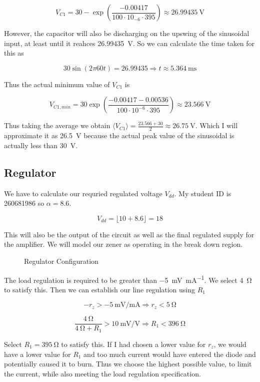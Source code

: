 \documentclass[journal]{IEEEtran}
\begin{document}
$$ V_{C1} = 30 - \exp \left( \frac{-0.00417}{100 \cdot 10_{-6} \cdot 395} \right) \approx \SI{26.99435}{\volt} $$

However, the capacitor will also be discharging on the upswing of the sinusoidal input, at least until it reahces \SI{26.99435}{\volt}. So we can calculate the time taken for this as

$$ 30 \sin\left( 2 \pi 60 t \right) = 26.99435 \Longrightarrow t \approx \SI{5.364}{\milli\second} $$

Thus the actual minimum value of $V_{C1}$ is

$$ V_{C1,min} = 30 \exp\left( \frac{-0.00417 - 0.00536}{100 \cdot 10^{-6} \cdot 395} \right) \approx \SI{23.566}{\volt}$$

Thus taking the average we obtain $ \langle V_{C1} \rangle = \frac{23.566 + 30}{2} \approx \SI{26.75}{\volt}$. Which I will approximate it as \SI{26.5}{\volt} because the actual peak value of the sinusoidal is actually less than \SI{30}{\volt}.

\subsection{Regulator}
We have to calculate our requried regulated voltage $V_{dd}$. My student ID is 260681986 so $\alpha = 8.6$.

$$V_{dd} = \lfloor 10 + 8.6 \rfloor = 18$$

This will also be the output of the circuit as well as the final regulated supply for the amplifier. We will model our zener as operating in the break down region.

\begin{figure}[h]
	\centering
	
	\caption{Regulator Configuration}
	\label{regconfig}
\end{figure}

The load regulation is required to be greater than \SI{-5}{\milli\volt\per\milli\ampere}. We select \SI{4}{\ohm} to satisfy this. Then we can establish our line regulation using $R_1$

$$ -r_z > \SI{-5}{\milli\volt\per\milli\ampere} \Longrightarrow r_z < \SI{5}{\ohm} $$

$$ \frac{\SI{4}{\ohm}}{\SI{4}{\ohm} + R_1} > \SI[per-mode=symbol]{10}{\milli\volt\per\volt} \Longrightarrow R_1 < \SI{396}{\ohm} $$

Select $R_1 = \SI{395}{\ohm}$ to satisfy this. If I had chosen a lower value for $r_z$, we would have a lower value for $R_1$ and too much current would have entered the diode and potentially caused it to burn. Thus we choose the highest possible value, to limit the current, while also meeting the load regulation specification.
\end{document}
